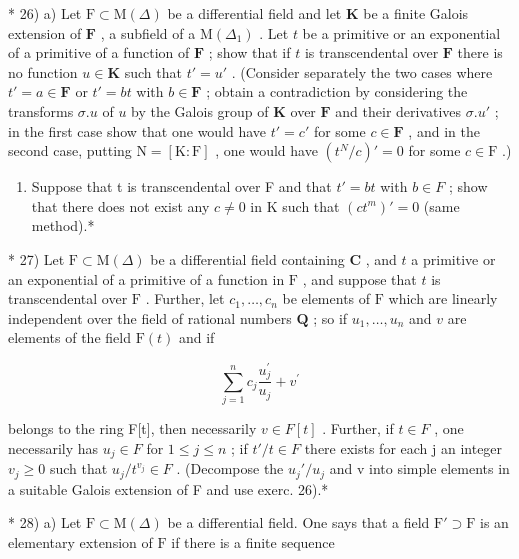 * 26) a) Let \(\mathrm{F} \subset \mathrm{M}(\Delta)\) be a differential field and let \(\mathbf{K}\) be a finite Galois extension of \(\mathbf{F}\) , a subfield of a \(\mathrm{M}(\Delta_1)\) . Let \(t\) be a primitive or an exponential of a primitive of a function of \(\mathbf{F}\) ; show that if \(t\) is transcendental over \(\mathbf{F}\) there is no function \(u \in \mathbf{K}\) such that \(t' = u'\) . (Consider separately the two cases where \(t' = a \in \mathbf{F}\) or \(t' = bt\) with \(b \in \mathbf{F}\) ; obtain a contradiction by considering the transforms \(\sigma.u\) of \(u\) by the Galois group of \(\mathbf{K}\) over \(\mathbf{F}\) and their derivatives \(\sigma.u'\) ; in the first case show that one would have \(t' = c'\) for some \(c \in \mathbf{F}\) , and in the second case, putting \(\mathrm{N} = [\mathrm{K}: \mathrm{F}]\) , one would have \((t^{N}/c)' = 0\) for some \(c \in \mathrm{F}\) .)

\begin{enumerate}
\def\labelenumi{\alph{enumi})}
\setcounter{enumi}{1}
\tightlist
\item
  Suppose that t is transcendental over F and that \(t' = bt\) with \(b \in F\) ; show that there does not exist any \(c \neq 0\) in K such that \((ct^{m})' = 0\) (same method).*
\end{enumerate}

* 27) Let \(\mathrm{F} \subset \mathrm{M}(\Delta)\) be a differential field containing \(\mathbf{C}\) , and \(t\) a primitive or an exponential of a primitive of a function in \(\mathrm{F}\) , and suppose that \(t\) is transcendental over \(\mathrm{F}\) . Further, let \(c_1, \ldots, c_n\) be elements of \(\mathrm{F}\) which are linearly independent over the field of rational numbers \(\mathbf{Q}\) ; so if \(u_1, \ldots, u_n\) and \(v\) are elements of the field \(\mathrm{F}(t)\) and if

\[
\sum_ {j = 1} ^ {n} c _ {j} \frac {u _ {j} ^ {\prime}}{u _ {j}} + v ^ {\prime}
\]

belongs to the ring F{[}t{]}, then necessarily \(v \in F[t]\) . Further, if \(t \in F\) , one necessarily has \(u_{j} \in F\) for \(1 \leqslant j \leqslant n\) ; if \(t' / t \in F\) there exists for each j an integer \(v_{j} \geqslant 0\) such that \(u_{j} / t^{v_{j}} \in F\) . (Decompose the \(u_{j}' / u_{j}\) and v into simple elements in a suitable Galois extension of F and use exerc. 26).*

* 28) a) Let \(\mathrm{F} \subset \mathrm{M}(\Delta)\) be a differential field. One says that a field \(\mathrm{F}' \supset \mathrm{F}\) is an elementary extension of \(\mathrm{F}\) if there is a finite sequence

